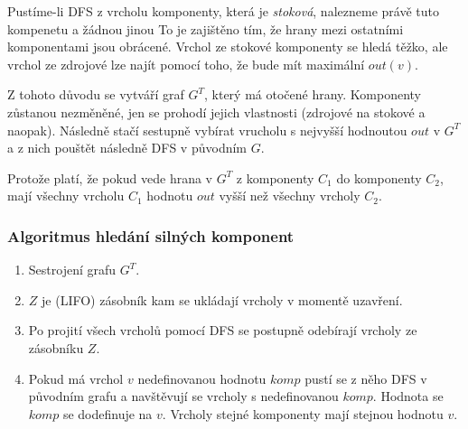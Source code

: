 Pustíme-li DFS z vrcholu komponenty, která je \textit{stoková}, nalezneme právě tuto kompenetu a žádnou jinou
To je zajištěno tím, že hrany mezi ostatními komponentami jsou obrácené.
Vrchol ze stokové komponenty se hledá těžko, ale vrchol ze zdrojové lze najít pomocí toho, že bude mít maximální $out(v)$.

Z tohoto důvodu se vytváří graf $G^T$, který má otočené hrany.
Komponenty zůstanou nezměněné, jen se prohodí jejich vlastnosti (zdrojové na stokové a naopak).
Následně stačí sestupně vybírat vrucholu s nejvyšší hodnoutou $out$ v $G^T$ a z nich pouštět následně DFS v původním $G$.

Protože platí, že pokud vede hrana v $G^T$ z komponenty $C_1$ do komponenty $C_2$, mají všechny vrcholu $C_1$ hodnotu $out$ vyšší než všechny vrcholy $C_2$.

\subsubsection{Algoritmus hledání silných komponent}

\begin{enumerate}
    \item Sestrojení grafu $G^T$.
    \item $Z$ je (LIFO) zásobník kam se ukládají vrcholy v momentě uzavření.
    \item Po projití všech vrcholů pomocí DFS se postupně odebírají vrcholy ze zásobníku $Z$.
    \item Pokud má vrchol $v$ nedefinovanou hodnotu $komp$ pustí se z něho DFS v původním grafu a navštěvují se vrcholy s nedefinovanou $komp$. Hodnota se $komp$ se dodefinuje na $v$. Vrcholy stejné komponenty mají stejnou hodnotu $v$.
\end{enumerate}
